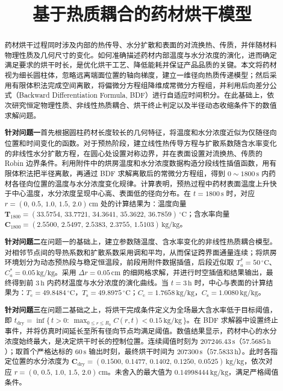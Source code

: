 \documentclass[12pt,a4paper,fontset=none]{ctexart}
\title{\vspace{-2.2em}\bfseries 基于热质耦合的药材烘干模型}
\author{}
\date{}
\newcommand{\problem}[1]{\par\noindent\hspace*{2em}\textbf{针对问题#1}\quad}
\begin{document}
\maketitle
\vspace{-4em}

\begin{abstract}
药材烘干过程同时涉及内部的热传导、水分扩散和表面的对流换热、传质，并伴随材料物理性质及几何尺寸的变化。如何准确描述药材内部温度与水分浓度的演化，进而确定满足要求的烘干时长，是优化烘干工艺、降低能耗并保证产品品质的关键。本文将药材视为细长圆柱体，忽略远离端面位置的轴向梯度，建立一维径向热质传递模型；然后采用有限体积法完成空间离散，将偏微分方程组降维成常微分方程组，并利用后向差分公式（Backward Differentiation Formula, BDF）进行自适应时间积分。在此基础上，依次研究恒定物理性质、非线性热质耦合、烘干终止判定以及半径动态收缩条件下的数值求解问题。

\problem{一}首先根据圆柱药材长度较长的几何特征，将温度和水分浓度近似为仅随径向位置和时间变化的函数。对于预热阶段，建立线性热传导方程与扩散系数随含水率变化的非线性水分扩散方程，在圆心处设置对称边界，并在表面设置对流换热、传质的 Robin 边界条件。利用附件中的烘房温度和水分浓度数据构造分段线性插值函数，用有限体积法把半径离散，再通过 BDF 求解离散后的常微分方程组，得到 $0\sim1800\,\mathrm{s}$ 内药材各径向位置的温度与水分浓度变化规律。计算表明，预热过程中药材表面温度上升快于中心温度，水分浓度呈现中心高、表面低的径向分布。在 $t=1800\,\mathrm{s}$ 时，对应 $r=(0,\,0.5,\,1.0,\,1.5,\,2.0)\,\mathrm{cm}$ 处的计算结果为：温度向量 $\bm T_{1800}=(33.5754,\allowbreak\, 33.7721,\allowbreak\, 34.3641,\allowbreak\, 35.3622,\allowbreak\, 36.7859)\,{}^\circ\mathrm C$；含水率向量 $\bm C_{1800}=(2.5500,\allowbreak\, 2.5497,\allowbreak\, 2.5383,\allowbreak\, 2.3755,\allowbreak\, 1.5103)\,\mathrm{kg/kg}$。

\problem{二}在问题一的基础上，建立参数随温度、含水率变化的非线性热质耦合模型。对相邻节点间的导热系数和扩散系数采用调和平均，从而保证跨界面通量连续；将烘房环境划分为动态预热段与稳定恒温段，前段用附件数据插值，后段近似取 $T_a^*=50\,{}^\circ\mathrm C$、$C_a^*=0.05\,\mathrm{kg/kg}$。采用 $\Delta r=0.05\,\mathrm{cm}$ 的细网格求解，并进行时空插值和结果输出，最终得到前 $3\,\mathrm h$ 内药材温度与水分浓度的演化曲线。当 $t=3\,\mathrm h$ 时，中心与表面的计算结果为：$T_{\mathrm c}=49.8484\,{}^\circ\mathrm C$，$T_{\mathrm s}=49.8975\,{}^\circ\mathrm C$；$C_{\mathrm c}=1.7658\,\mathrm{kg/kg}$，$C_{\mathrm s}=1.0080\,\mathrm{kg/kg}$。

\newpage
\problem{三}在问题二基础之上，将烘干完成条件定义为全场最大含水率低于目标阈值，即 $t_{\mathrm{dry}}=\inf\{\,t>0:\ \max_{0\le r\le R_0}C(r,t)<0.15\,\mathrm{kg/kg}\,\}$。在 BDF 求解器中设置终止事件，并将仿真时间延长至所有径向节点均满足阈值。数值结果显示，药材中心的水分浓度始终最大，是决定烘干时长的控制位置。连续阈值时刻为 $207246.43\,\mathrm{s}$（$57.5685\,\mathrm h$）；取首个严格达标的 $60\,\mathrm{s}$ 输出时刻，最终烘干时间为 $207300\,\mathrm{s}$（$57.5833\,\mathrm h$）。此时各指定位置的水分浓度为 $\bm C_{\mathrm{dry}}=(0.1500,\allowbreak\,0.1477,\allowbreak\,0.1402,\allowbreak\,0.1250,\allowbreak\,0.0525)\,\mathrm{kg/kg}$，依次对应 $r=(0,\,0.5,\,1.0,\,1.5,\,2.0)\,\mathrm{cm}$。未舍入的最大值为 $0.14998444\,\mathrm{kg/kg}$，满足严格阈值条件。


\end{abstract}
\end{document}
